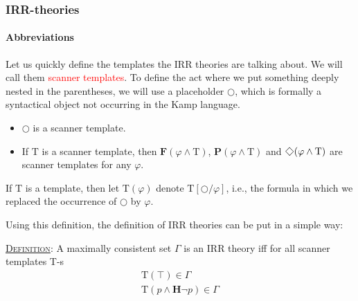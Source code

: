 \documentclass[xcolor=x11names]{beamer}
\newcommand{\dzsa}[1]{\textsc{\underline{#1}}:}
\newcommand{\cemph}[1]{\textcolor{red}{#1}}
\newcommand{\FD}{\mathbf F}
\newcommand{\PD}{\mathbf P}
\renewcommand{\Diamond}{\scalebox{.9}{\raisebox{-.4ex}{\rotatebox{45}{$\Box$}}}}
\newcommand{\lrule}[3][c]{\begin{array}{#1} #2  \\  \hline #3 \end{array}}
\begin{document}
\begin{frame}[t]
	\frametitle{IRR-theories}
\framesubtitle{Abbreviations}
\scriptsize

Let us quickly define the templates the IRR theories are talking about. We will call them \cemph{scanner templates}. To define the act where we put something deeply nested in the parentheses, we will use a placeholder $\bigcirc$, which is formally a syntactical object not occurring in the Kamp language.

\begin{itemize}
\item $\bigcirc$ is a scanner template.
\item If $\mathrm T$ is a scanner template, then $\FD (\varphi \land \mathrm T)$, $\PD(\varphi \land \mathrm T)$ and $\Diamond (\varphi \land \mathrm T)$ are scanner templates for any $\varphi$.
\end{itemize}

If $\mathrm T$ is a template, then let $\mathrm T(\varphi)$ denote $\mathrm T[\bigcirc/\varphi]$, i.e., the formula in which we replaced the occurrence of $\bigcirc$ by $\varphi$.

\bigskip

Using this definition, the definition of IRR theories can be put in a simple way:
\bigskip

\dzsa{Definition}
A maximally consistent set $\Gamma$ is an IRR theory iff for all scanner templates T-s
\[\lrule[l] {\mathrm T(\top)\in \Gamma}
         {\mathrm T (p \land \mathbf H \lnot p)\in \Gamma}\]

\end{frame}
\end{document}
